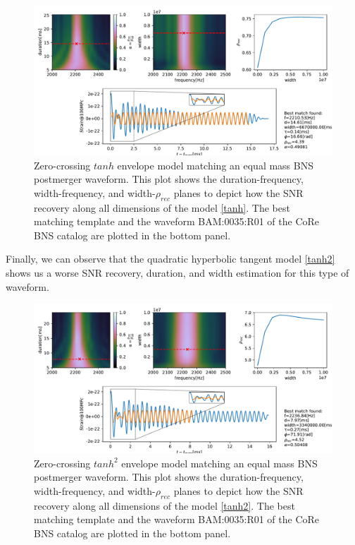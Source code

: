 \begin{figure}[hbt!]
\begin{center}
\includegraphics[width=\textwidth, angle=0]{images/Data_analysis/results/envel_35_tanh.pdf}
\captionsetup{width=0.8\textwidth}
\caption[Zero-crossing $tanh$ envelope model matching an equal mass BNS postmerger waveform]{Zero-crossing $tanh$ envelope model matching an equal mass BNS postmerger waveform. This plot shows the duration-frequency, width-frequency, and width-$\rho_{rec}$ planes to depict how the SNR recovery along all dimensions of the model \ref{tanh}. The best matching template and the waveform BAM:0035:R01 of the CoRe BNS catalog \cite{Dietrich:2018phi} are plotted in the bottom panel.}
\end{center}
\end{figure}

\FloatBarrier

Finally, we can observe that the quadratic hyperbolic tangent model \ref{tanh2} shows us a worse SNR recovery, duration, and width estimation for this type of waveform.

\begin{figure}[hbt!]
\begin{center}
\includegraphics[width=\textwidth, angle=0]{images/Data_analysis/results/envel_35_tanh2.pdf}
\captionsetup{width=0.8\textwidth}
\caption[Zero-crossing $tanh^2$ envelope model matching an equal mass BNS postmerger waveform]{Zero-crossing $tanh^2$ envelope model matching an equal mass BNS postmerger waveform. This plot shows the duration-frequency, width-frequency, and width-$\rho_{rec}$ planes to depict how the SNR recovery along all dimensions of the model \ref{tanh2}. The best matching template and the waveform BAM:0035:R01 of the CoRe BNS catalog \cite{Dietrich:2018phi} are plotted in the bottom panel.}
\end{center}
\end{figure}

